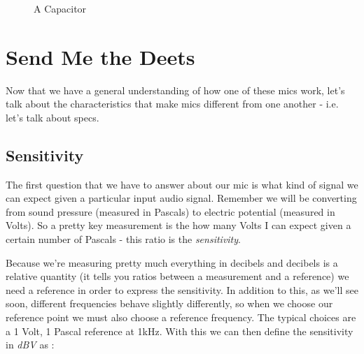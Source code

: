 \documentclass[12pt,a6paper]{book}
\begin{document}
\begin{figure}[!htb]
\caption{\label{fig:my-label} A Capacitor}
\end{figure}


\clearpage
\section{Send Me the Deets}
Now that we have a general understanding of how one of these mics work, let's talk about the characteristics that make mics different from one another - i.e. let's talk about specs. 

\subsection{Sensitivity}
The first question that we have to answer about our mic is what kind of signal we can expect given a particular input audio signal. Remember we will be converting from sound pressure (measured in Pascals) to electric potential (measured in Volts). So a pretty key measurement is the how many Volts I can expect given a certain number of Pascals - this ratio is the \textit{sensitivity}.

Because we're measuring pretty much everything in decibels and decibels is a relative quantity (it tells you ratios between a measurement and a reference) we need a reference in order to express the sensitivity. In addition to this, as we'll see soon, different frequencies behave slightly differently, so when we choose our reference point we must also choose a reference frequency. The typical choices are a 1 Volt, 1 Pascal reference at 1kHz. With this we can then define the sensitivity in \textit{dBV} as \cite{jlewis}:
\end{document}
